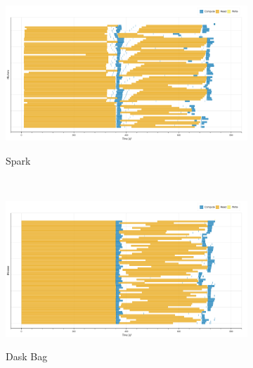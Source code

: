 \documentclass[conference]{IEEEtran}
\begin{document}
\begin{figure}[!tb]
    \centering
    \begin{subfigure}[b]{\columnwidth}
        \href{https://zenodo.org/record/3354434/files/spark-histo_np-baseline.html?download=1}{
        \includegraphics[clip,width=\columnwidth,
        height=0.15\textheight]{images/spark_histo_np_gantt.png}}
        \caption{Spark}\label{fig:histo_np_spark_gantt}
    \end{subfigure}
    \\
    \begin{subfigure}[b]{\columnwidth}
        \href{https://zenodo.org/record/3354434/files/dask-bag-histo_np-baseline.html?download=1}{
        \includegraphics[clip,width=\columnwidth,
        height=0.15\textheight]{images/bag_histo_np_gantt.png}}
        \caption{Dask Bag}\label{fig:histo_np_dask_bag_gantt}
    \end{subfigure}
    \\
    \begin{subfigure}[b]{\columnwidth}
        \href{https://zenodo.org/record/3354434/files/dask-delayed-histo_np-baseline.html?download=1}{
}
\end{subfigure}
\end{figure}
\end{document}
